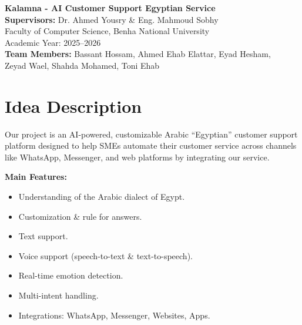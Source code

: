 \documentclass[12pt,a4paper]{article}
\begin{document}
\begin{center}
    {\Huge \textbf{Kalamna - AI Customer Support Egyptian Service}}\\[0.8cm]

    {\large \textbf{Supervisors:} Dr. Ahmed Yousry \& Eng. Mahmoud Sobhy}\\[0.3cm]

    {\large Faculty of Computer Science, Benha National University}\\[0.3cm]
    {\large Academic Year: 2025–2026}\\[0.3cm]

    {\small \textbf{Team Members:} Bassant Hossam, Ahmed Ehab Elattar, Eyad Hesham,\\ 
    Zeyad Wael, Shahda Mohamed, Toni Ehab}\\[0.8cm]
\end{center}

\section{Idea Description}
Our project is an AI-powered, customizable Arabic “Egyptian” customer support platform designed to help SMEs automate their customer service across channels like WhatsApp, Messenger, and web platforms by integrating our service.

\textbf{Main Features:}
\begin{itemize}[noitemsep]
    \item Understanding of the Arabic dialect of Egypt.
    \item Customization \& rule for answers.
    \item Text support.
    \item Voice support (speech-to-text \& text-to-speech).
    \item Real-time emotion detection.
    \item Multi-intent handling.
    \item Integrations: WhatsApp, Messenger, Websites, Apps.
\end{itemize}

\end{document}
